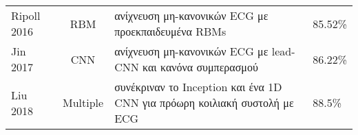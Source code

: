 \begin{sidewaystable}
\begin{tabular}{l c l l}
		\midrule
		Ripoll 2016~\cite{ripoll2016ecg}       & RBM             & ανίχνευση μη-κανονικών ECG με προεκπαιδευμένα RBMs                                           & 85.52\%                                                                                                                                                                                                                                                                                                                                                                                                                                                                                                                                                                                                                                                                                                                                                                                                                                                                          \\
		Jin 2017~\cite{jin2017classification}  & CNN             & ανίχνευση μη-κανονικών ECG με lead-CNN και κανόνα συμπερασμού                                & 86.22\%                                                                                                                                                                                                                                                                                                                                                                                                                                                                                                                                                                                                                                                                                                                                                                                                                                                                          \\
		Liu 2018~\cite{liu2018detecting}       & Multiple        & συνέκριναν το Inception και ένα 1D CNN για πρόωρη κοιλιακή συστολή με ECG                    & 88.5\%                                                                                                                                                                                                                                                                                                                                                                                                                                                                                                                                                                                                                                                                                                                                                                                                                                                                           \\

\end{tabular}
\end{sidewaystable}
